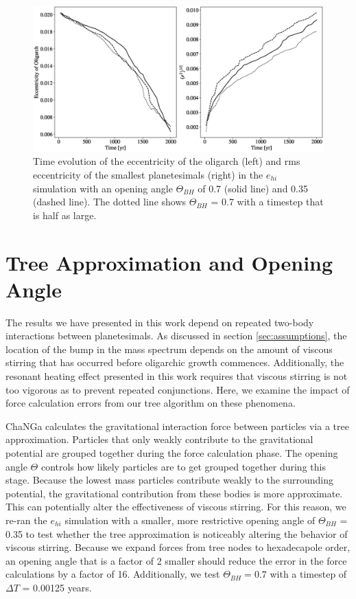 \begin{figure}
    \includegraphics[width=\textwidth]{figures/plSS/theta_test.eps}
    \caption{Time evolution of the eccentricity of the oligarch (left) and rms eccentricity of the smallest planetesimals (right) in the 
    $e_{hi}$ simulation with an opening angle $\Theta_{BH}$ of 0.7 (solid line) and 0.35 (dashed line). The dotted line shows 
    $\Theta_{BH}$ = 0.7 with a timestep that is half as large.}
    \label{fig:theta_test}
\end{figure}

\section{Tree Approximation and Opening Angle}\label{sec:openAngle}

The results we have presented in this work depend on repeated two-body interactions between planetesimals. As discussed in 
section \ref{sec:assumptions}, the location of the bump in the mass spectrum depends on the amount of viscous stirring that 
has occurred before oligarchic growth commences. Additionally, the resonant heating effect presented in this work requires that 
viscous stirring is not too vigorous as to prevent repeated conjunctions. Here, we examine the impact of force calculation errors 
from our tree algorithm on these phenomena.

{\sc ChaNGa} calculates the gravitational interaction force between particles via a tree approximation. Particles that only weakly 
contribute to the gravitational potential are grouped together during the force calculation phase. The opening angle $\Theta$ 
controls how likely particles are to get grouped together during this stage. Because the lowest mass particles contribute weakly 
to the surrounding potential, the gravitational contribution from these bodies is more approximate. This can potentially alter the 
effectiveness of viscous stirring. For this reason, we re-ran the $e_{hi}$ simulation with a smaller, more restrictive opening 
angle of $\Theta_{BH}$ = 0.35 to test whether the tree approximation is noticeably altering the behavior of viscous stirring. 
Because we expand forces from tree nodes to hexadecapole order, an opening angle that is a factor of 2 smaller should reduce 
the error in the force calculations by a factor of 16. Additionally, we test $\Theta_{BH} = 0.7$ with a timestep of $\Delta T$ = 
0.00125 years.


